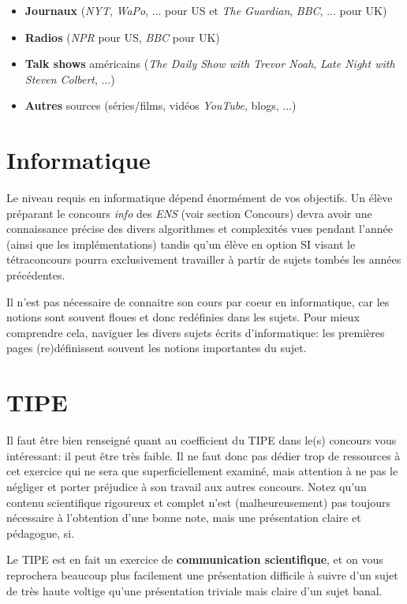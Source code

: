 \documentclass{article}
\begin{document}
\begin{itemize}
\item  \textbf{Journaux} (\textit{NYT}, \textit{WaPo}, ... pour US et \textit{The Guardian}, \textit{BBC}, ... pour UK)
\item  \textbf{Radios} (\textit{NPR} pour US, \textit{BBC} pour UK)
\item  \textbf{Talk shows} américains (\textit{The Daily Show with Trevor Noah}, \textit{Late Night with Steven Colbert}, ...)
\item  \textbf{Autres} sources (séries/films, vidéos \textit{YouTube}, blogs, ...)

\end{itemize}

\section{Informatique}
Le niveau requis en informatique dépend énormément de vos objectifs.
Un élève préparant le concours \textit{info} des \textit{ENS} (voir section Concours) devra avoir une connaissance précise des divers algorithmes et complexités vues pendant l'année (ainsi que les implémentations) tandis qu'un élève en option SI visant le tétraconcours pourra exclusivement travailler à partir de sujets tombés les années précédentes.

Il n'est pas nécessaire de connaitre son cours par coeur en informatique, car les notions sont souvent floues et donc redéfinies dans les sujets.
Pour mieux comprendre cela, naviguer les divers sujets écrits d'informatique: les premières pages (re)définissent souvent les notions importantes du sujet.

\section{TIPE}
Il faut être bien renseigné quant au coefficient du TIPE dans le(s) concours vous intéressant: il peut être très faible.
Il ne faut donc pas dédier trop de ressources à cet exercice qui ne sera que superficiellement examiné, mais attention à ne pas le négliger et porter préjudice à son travail aux autres concours.
Notez qu'un contenu scientifique rigoureux et complet n'est (malheureusement) pas toujours nécessaire à l'obtention d'une bonne note, mais une présentation claire et pédagogue, si.

Le TIPE est en fait un exercice de \textbf{communication scientifique}, et on vous reprochera beaucoup plus facilement une présentation difficile à suivre d'un sujet de très haute voltige qu'une présentation triviale mais claire d'un sujet banal.
\end{document}
